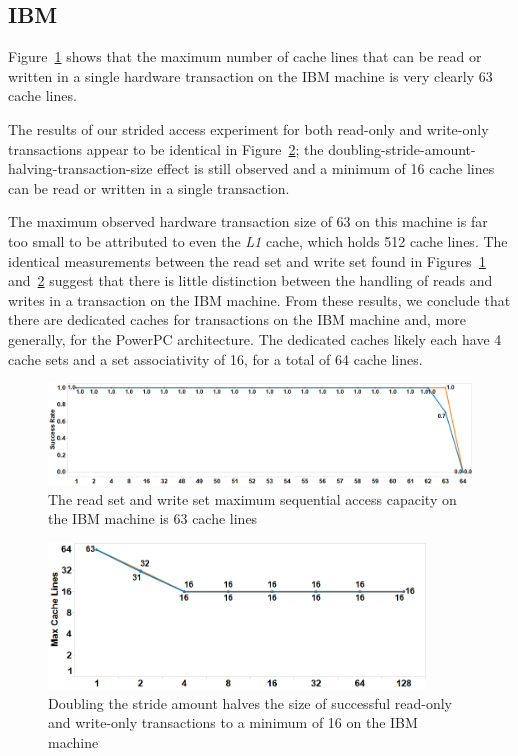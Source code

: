 \subsection*{IBM}

Figure~\ref{fig:wttm_capacity_readwrite_ibm} shows that the maximum number of
cache lines that can be read or written in a single hardware transaction on the
IBM machine is very clearly 63 cache lines.

The results of our strided access experiment for both read-only and write-only
transactions appear to be identical in
Figure~\ref{fig:wttm_stride_readwrite_ibm}; the
doubling-stride-amount-halving-transaction-size effect is still observed and a
minimum of 16 cache lines can be read or written in a single transaction.

The maximum observed hardware transaction size of 63 on this machine is far too
small to be attributed to even the \textit{L1} cache, which holds 512 cache
lines. The identical measurements between the read set and write set found in
Figures~\ref{fig:wttm_capacity_readwrite_ibm}
and~\ref{fig:wttm_stride_readwrite_ibm} suggest that there is little distinction
between the handling of reads and writes in a transaction on the IBM machine.
From these results, we conclude that there are dedicated caches for transactions
on the IBM machine and, more generally, for the PowerPC architecture. The
dedicated caches likely each have 4 cache sets and a set associativity of 16,
for a total of 64 cache lines.

\begin{figure}[]%
\centering
{}
\includegraphics[width=\linewidth]{images/wttm_capacity_readwrite_ibm}
\caption{The read set and write set maximum sequential access capacity on the
IBM machine is 63 cache lines}
\label{fig:wttm_capacity_readwrite_ibm}
\end{figure}

\begin{figure}[]%
\centering
{}
\includegraphics[width=100mm]{images/wttm_stride_readwrite_ibm}
\caption{Doubling the stride amount halves the size of successful read-only and
write-only transactions to a minimum of 16 on the IBM machine}
\label{fig:wttm_stride_readwrite_ibm}
\end{figure}

